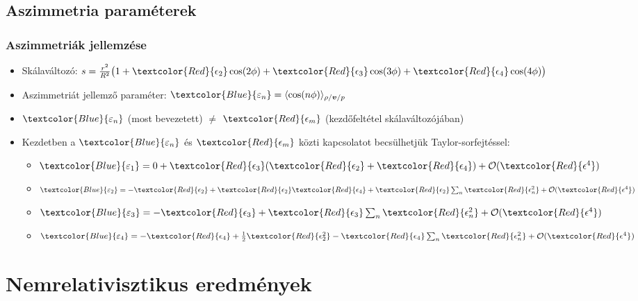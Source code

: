 \documentclass{beamer}
\begin{document}
\subsection{Aszimmetria paraméterek}
\begin{frame}
\frametitle{Aszimmetriák jellemzése}
\begin{itemize}
  \setlength{\itemsep}{12pt}
\item<1-> Skálaváltozó: $s=\frac{r^2}{R^2}\big(1+\textcolor{Red}{\epsilon_2}\cos(2\phi)+\textcolor{Red}{\epsilon_3}\cos(3\phi)+\textcolor{Red}{\epsilon_4}\cos(4\phi)\big)$
\item<1-> Aszimmetriát jellemző paraméter: $\textcolor{Blue}{\varepsilon_n}=\langle \cos(n\phi)\rangle_{\rho/\bm{v}/p}$
\item<1-> $\textcolor{Blue}{\varepsilon_n}$ (most bevezetett)  $\neq$ $\textcolor{Red}{\epsilon_m}$  (kezdőfeltétel skálaváltozójában)
\item<1-> Kezdetben a $\textcolor{Blue}{\varepsilon_n}$ és $\textcolor{Red}{\epsilon_m}$ közti kapcsolatot becsülhetjük Taylor-sorfejtéssel:
\vspace{10pt}
\begin{itemize}
 \setlength{\itemsep}{8pt}
\item<1-> $\textcolor{Blue}{\varepsilon_1}=0+\textcolor{Red}{\epsilon_3}(\textcolor{Red}{\epsilon_2}+\textcolor{Red}{\epsilon_4})+\mathcal{O}(\textcolor{Red}{\epsilon^4})$
\item<1-> $\textcolor{Blue}{\varepsilon_2}=-\textcolor{Red}{\epsilon_2}+\textcolor{Red}{\epsilon_2}\textcolor{Red}{\epsilon_4}+\textcolor{Red}{\epsilon_2}\sum_{n} \textcolor{Red}{\epsilon_n^2}+\mathcal{O}(\textcolor{Red}{\epsilon^4})$
\item<1-> $\textcolor{Blue}{\varepsilon_3}=-\textcolor{Red}{\epsilon_3}+\textcolor{Red}{\epsilon_3}\sum_n \textcolor{Red}{\epsilon_n^2}+\mathcal{O}(\textcolor{Red}{\epsilon^4})$
\item<1-> $\textcolor{Blue}{\varepsilon_4}=-\textcolor{Red}{\epsilon_4}+\frac{1}{2}\textcolor{Red}{\epsilon_2^2}-\textcolor{Red}{\epsilon_4}\sum_n\textcolor{Red}{\epsilon_n^2}+\mathcal{O}(\textcolor{Red}{\epsilon^4})$
\end{itemize}
\end{itemize}

\end{frame}

\section{Nemrelativisztikus eredmények}
\end{document}
